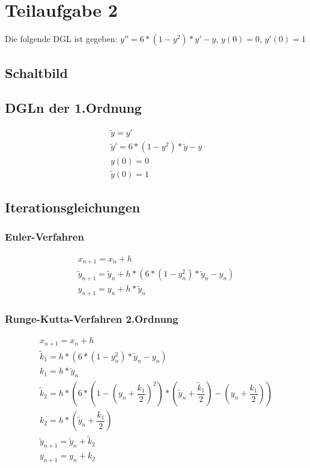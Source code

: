 \documentclass[]{scrartcl}
\begin{document}
\section{Teilaufgabe 2}
Die folgende DGL ist gegeben:
$ y'' = 6 * (1 - y^{2}) * y' - y $,
$ y(0) = 0 $,
$ y'(0) = 1 $

\subsection{Schaltbild}

\subsection{DGLn der 1.Ordnung}
\begin{align}
\tilde{y} = y' \\
\tilde{y}' = 6 * (1 - y^{2}) * \tilde{y} - y \\
y(0)  = 0 \\
\tilde{y}(0) = 1
\end{align}

\subsection{Iterationsgleichungen}

\subsubsection{Euler-Verfahren}
\begin{align}
x_{n+1} = x_{n}+h \\
\tilde{y}_{n+1} = \tilde{y}_{n}+h*(6 * (1 - y_{n}^{2}) * \tilde{y}_{n} - y_{n}) \\
y_{n+1} = y_{n} + h * \tilde{y}_{n}
\end{align}

\subsubsection{Runge-Kutta-Verfahren 2.Ordnung}
\begin{align}
x_{n+1} = x_{n}+h \\
\tilde{k}_{1} = h * (6 * (1 - y_{n}^{2}) * \tilde{y}_{n} - y_{n}) \\
k_{1} = h * \tilde{y}_{n} \\
\tilde{k}_{2} = h * (6 * (1 - (y_{n} + \dfrac{k_{1}}{2})^{2}) * (\tilde{y}_{n} + \dfrac{\tilde{k}_{1}}{2}) - (y_{n} + \dfrac{k_{1}}{2})) \\
k_{2} = h * (\tilde{y}_{n} + \dfrac{k_{1}}{2}) \\
\tilde{y}_{n+1} = \tilde{y}_{n}+\tilde{k}_{2} \\
y_{n+1} = y_{n}+k_{2}
\end{align}
\end{document}
